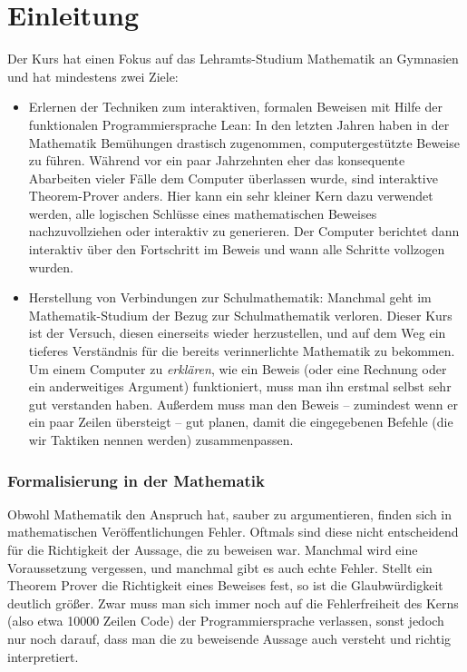 \documentclass[11pt]{article}
\begin{document}
\section{Einleitung}
Der Kurs hat einen Fokus auf das Lehramts-Studium Mathematik an Gymnasien und hat mindestens zwei Ziele:
\begin{itemize}
\item \sloppy Erlernen der Techniken zum interaktiven, formalen Beweisen mit Hilfe der funktionalen Programmiersprache Lean: In den letzten Jahren haben in der Mathematik Bemühungen drastisch zugenommen, computergestützte Beweise zu führen. Während vor ein paar Jahrzehnten eher das konsequente Abarbeiten vieler Fälle dem Computer überlassen wurde, sind interaktive Theorem-Prover anders. Hier kann ein sehr kleiner Kern dazu verwendet werden, alle logischen Schlüsse eines mathematischen Beweises nachzuvollziehen oder interaktiv zu generieren. Der Computer berichtet dann interaktiv über den Fortschritt im Beweis und wann alle Schritte vollzogen wurden. 
\item Herstellung von Verbindungen zur Schulmathematik: Manchmal geht im Mathematik-Studium der Bezug zur Schulmathematik verloren. Dieser Kurs ist der Versuch, diesen einerseits wieder herzustellen, und auf dem Weg ein tieferes Verständnis für die bereits verinnerlichte Mathematik zu bekommen. Um einem Computer zu {\it erklären}, wie ein Beweis (oder eine Rechnung oder ein anderweitiges Argument) funktioniert, muss man ihn erstmal selbst sehr gut verstanden haben. Außerdem muss man den Beweis -- zumindest wenn er ein paar Zeilen übersteigt -- gut planen, damit die eingegebenen Befehle (die wir Taktiken nennen werden) zusammenpassen.
\end{itemize}


\subsubsection*{Formalisierung in der Mathematik}
\sloppy Obwohl Mathematik den Anspruch hat, sauber zu argumentieren, finden sich in mathematischen Veröffentlichungen Fehler. Oftmals sind diese nicht entscheidend für die Richtigkeit der Aussage, die zu beweisen war. Manchmal wird eine Voraussetzung vergessen, und manchmal gibt es auch echte Fehler. Stellt ein Theorem Prover die Richtigkeit eines Beweises fest, so ist die Glaubwürdigkeit deutlich größer. Zwar muss man sich immer noch auf die Fehlerfreiheit des Kerns (also etwa 10000 Zeilen Code) der Programmiersprache verlassen, sonst jedoch nur noch darauf, dass man die zu beweisende Aussage auch versteht und richtig interpretiert. 
\end{document}
